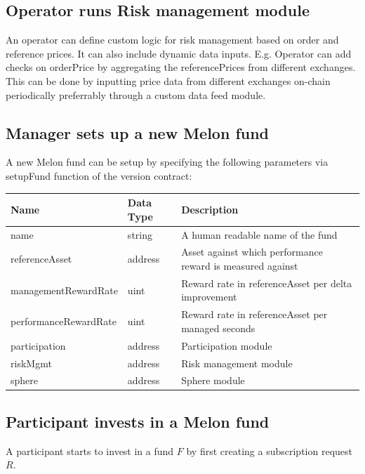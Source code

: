 \documentclass[conference]{IEEEtran}
\begin{document}
\subsection{Operator runs Risk management module}

An operator can define custom logic for risk management based on order and reference prices. It can also include dynamic data inputs. E.g. Operator can add checks on orderPrice by aggregating the referencePrices from different exchanges. This can be done by inputting price data from different exchanges on-chain periodically preferrably through a custom data feed module.

\subsection{Manager sets up a new Melon fund}	\label{interaction:setup-fund}

A new Melon fund can be setup by specifying the following parameters via setupFund function of the version contract:

\begin{center}
		\footnotesize
		\begin{tabular}{ | p{2.7cm} | p{0.8cm} | p{4cm} | }
		\hline
		Name & Data Type & Description \\ \hline
		name & string & A human readable name of the fund \\ \hline
		referenceAsset & address & Asset against which performance reward is measured against \\ \hline
		managementRewardRate & uint	& Reward rate in referenceAsset per delta improvement \\ \hline
		performanceRewardRate & uint & Reward rate in referenceAsset per managed seconds \\ \hline
		participation & address	& Participation module \\ \hline
		riskMgmt & address & Risk management module \\ \hline
		sphere & address & Sphere module \\ \hline
		\end{tabular}
\end{center}

\subsection{Participant invests in a Melon fund} \label{interaction:invest}

A participant starts to invest in a fund $F$ by first creating a subscription request $R$.
\end{document}
